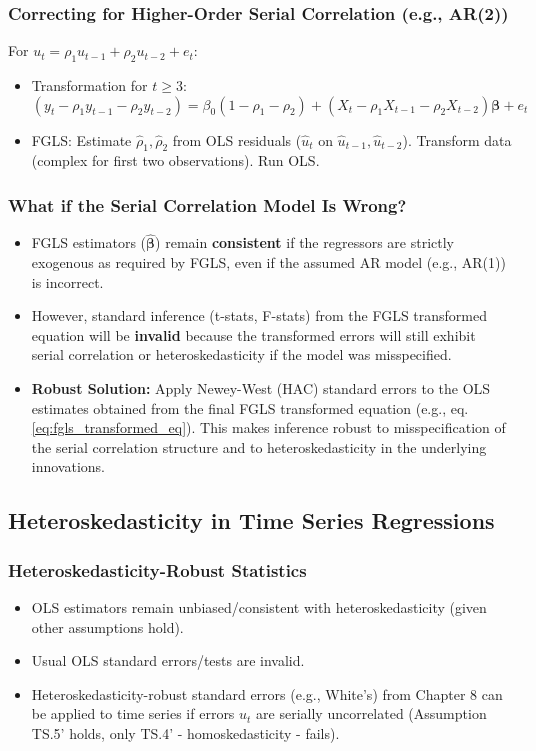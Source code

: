 \documentclass[a4paper, 10pt]{article}
\theoremstyle{definition}	%
\begin{document}
\subsubsection{Correcting for Higher-Order Serial Correlation (e.g., AR(2))}
For \(u_t = \rho_1 u_{t-1} + \rho_2 u_{t-2} + e_t\):
\begin{itemize}
    \item Transformation for \(t \ge 3\):
    \[ (y_t - \rho_1 y_{t-1} - \rho_2 y_{t-2}) = \beta_0(1-\rho_1-\rho_2) + (X_t - \rho_1 X_{t-1} - \rho_2 X_{t-2})\boldsymbol{\beta} + e_t \]
    \item FGLS: Estimate \(\hat{\rho}_1, \hat{\rho}_2\) from OLS residuals (\(\hat{u}_t\) on \(\hat{u}_{t-1}, \hat{u}_{t-2}\)). Transform data (complex for first two observations). Run OLS.
\end{itemize}

\subsubsection{What if the Serial Correlation Model Is Wrong?}
\begin{itemize}
    \item FGLS estimators (\(\hat{\boldsymbol{\beta}}\)) remain \textbf{consistent} if the regressors are strictly exogenous as required by FGLS, even if the assumed AR model (e.g., AR(1)) is incorrect.
    \item However, standard inference (t-stats, F-stats) from the FGLS transformed equation will be \textbf{invalid} because the transformed errors will still exhibit serial correlation or heteroskedasticity if the model was misspecified.
    \item \textbf{Robust Solution:} Apply Newey-West (HAC) standard errors to the OLS estimates obtained from the final FGLS transformed equation (e.g., eq. \eqref{eq:fgls_transformed_eq}). This makes inference robust to misspecification of the serial correlation structure and to heteroskedasticity in the underlying innovations.
\end{itemize}

\subsection{Heteroskedasticity in Time Series Regressions}

\subsubsection{Heteroskedasticity-Robust Statistics}
\begin{itemize}
    \item OLS estimators remain unbiased/consistent with heteroskedasticity (given other assumptions hold).
    \item Usual OLS standard errors/tests are invalid.
    \item Heteroskedasticity-robust standard errors (e.g., White's) from Chapter 8 can be applied to time series if errors \(u_t\) are serially uncorrelated (Assumption TS.5' holds, only TS.4' - homoskedasticity - fails).
\end{itemize}
\end{document}

